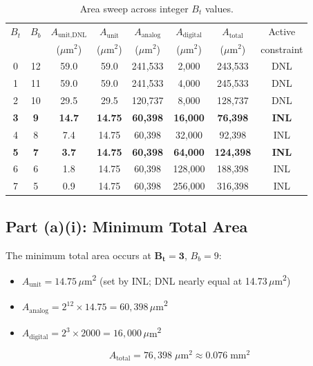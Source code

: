 \documentclass{article}
\begin{document}
\begin{table}[H]
\centering
\caption{Area sweep across integer $B_t$ values.}
\small
\begin{tabular}{@{}cccccccc@{}}
\toprule
$B_t$ & $B_b$ & $A_\text{unit,DNL}$ & $A_\text{unit}$ & $A_\text{analog}$ & $A_\text{digital}$ & $A_\text{total}$ & Active \\
      &       & ($\mu$m$^2$)        & ($\mu$m$^2$)    & ($\mu$m$^2$)      & ($\mu$m$^2$)       & ($\mu$m$^2$)     & constraint \\
\midrule
0  & 12 & 59.0  & 59.0  & 241{,}533 & 2{,}000   & 243{,}533  & DNL \\
1  & 11 & 59.0  & 59.0  & 241{,}533 & 4{,}000   & 245{,}533  & DNL \\
2  & 10 & 29.5  & 29.5  & 120{,}737 & 8{,}000   & 128{,}737  & DNL \\
\textbf{3}  & \textbf{9}  & \textbf{14.7}  & \textbf{14.75} & \textbf{60{,}398}  & \textbf{16{,}000}  & \textbf{76{,}398}   & \textbf{INL} \\
4  & 8  & 7.4   & 14.75 & 60{,}398  & 32{,}000  & 92{,}398   & INL \\
\textbf{5}  & \textbf{7}  & \textbf{3.7}   & \textbf{14.75} & \textbf{60{,}398}  & \textbf{64{,}000}  & \textbf{124{,}398}  & \textbf{INL} \\
6  & 6  & 1.8   & 14.75 & 60{,}398  & 128{,}000 & 188{,}398  & INL \\
7  & 5  & 0.9   & 14.75 & 60{,}398  & 256{,}000 & 316{,}398  & INL \\
\bottomrule
\end{tabular}
\label{tab:sweep}
\end{table}

\subsection{Part (a)(i): Minimum Total Area}

The minimum total area occurs at $\mathbf{B_t = 3}$, $B_b = 9$:
\begin{itemize}
    \item $A_\text{unit} = 14.75$\,$\mu$m\textsuperscript{2} (set by INL; DNL nearly equal at 14.73\,$\mu$m\textsuperscript{2})
    \item $A_\text{analog} = 2^{12} \times 14.75 = 60{,}398$\,$\mu$m\textsuperscript{2}
    \item $A_\text{digital} = 2^3 \times 2000 = 16{,}000$\,$\mu$m\textsuperscript{2}
\end{itemize}
\begin{equation}
    \boxed{A_\text{total} = 76{,}398\;\mu\text{m}^2 \approx 0.076\;\text{mm}^2}
\end{equation}
\end{document}
